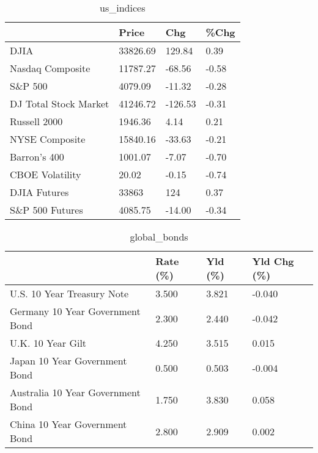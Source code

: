 \documentclass{article}%
\begin{document}
%


\begin{table}[htbp]%
\caption{us\_indices}%
\centering%
\begin{adjustbox}{width=1\textwidth}%
\begin{tabular}{llll}
\toprule
                      &    Price &     Chg &  \%Chg \\
\midrule
                 DJIA & 33826.69 &  129.84 &  0.39 \\
     Nasdaq Composite & 11787.27 &  -68.56 & -0.58 \\
              S\&P 500 &  4079.09 &  -11.32 & -0.28 \\
DJ Total Stock Market & 41246.72 & -126.53 & -0.31 \\
         Russell 2000 &  1946.36 &    4.14 &  0.21 \\
       NYSE Composite & 15840.16 &  -33.63 & -0.21 \\
         Barron's 400 &  1001.07 &   -7.07 & -0.70 \\
      CBOE Volatility &    20.02 &   -0.15 & -0.74 \\
         DJIA Futures &    33863 &     124 &  0.37 \\
      S\&P 500 Futures &  4085.75 &  -14.00 & -0.34 \\
\bottomrule
\end{tabular}
%
\end{adjustbox}%
\end{table}

%


\begin{table}[htbp]%
\caption{global\_bonds}%
\centering%
\begin{adjustbox}{width=1\textwidth}%
\begin{tabular}{llll}
\toprule
                                  & Rate (\%) & Yld (\%) & Yld Chg (\%) \\
\midrule
       U.S. 10 Year Treasury Note &    3.500 &   3.821 &      -0.040 \\
  Germany 10 Year Government Bond &    2.300 &   2.440 &      -0.042 \\
                U.K. 10 Year Gilt &    4.250 &   3.515 &       0.015 \\
    Japan 10 Year Government Bond &    0.500 &   0.503 &      -0.004 \\
Australia 10 Year Government Bond &    1.750 &   3.830 &       0.058 \\
    China 10 Year Government Bond &    2.800 &   2.909 &       0.002 \\
\bottomrule
\end{tabular}
%
\end{adjustbox}%
\end{table}
\end{document}
